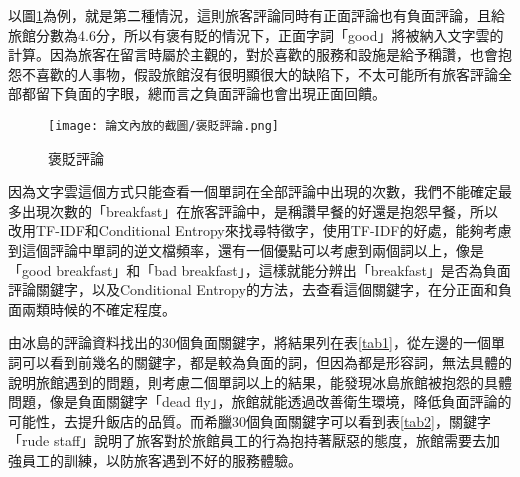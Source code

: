 \noindent 以圖\ref{Fig3}為例，就是第二種情況，這則旅客評論同時有正面評論也有負面評論，且給旅館分數為4.6分，所以有褒有貶的情況下，正面字詞「good」將被納入文字雲的計算。因為旅客在留言時屬於主觀的，對於喜歡的服務和設施是給予稱讚，也會抱怨不喜歡的人事物，假設旅館沒有很明顯很大的缺陷下，不太可能所有旅客評論全部都留下負面的字眼，總而言之負面評論也會出現正面回饋。
	
	\begin{figure}[H]
	\centering
	\texttt{[image: 論文內放的截圖/褒貶評論.png]}
	\caption{褒貶評論}
	\label{Fig3}
	\end{figure}

	因為文字雲這個方式只能查看一個單詞在全部評論中出現的次數，我們不能確定最多出現次數的「breakfast」在旅客評論中，是稱讚早餐的好還是抱怨早餐，所以改用TF-IDF和Conditional Entropy來找尋特徵字，使用TF-IDF的好處，能夠考慮到這個評論中單詞的逆文檔頻率，還有一個優點可以考慮到兩個詞以上，像是「good breakfast」和「bad breakfast」，這樣就能分辨出「breakfast」是否為負面評論關鍵字，以及Conditional Entropy的方法，去查看這個關鍵字，在分正面和負面兩類時候的不確定程度。 
	
	由冰島的評論資料找出的30個負面關鍵字，將結果列在表\ref{tab1}，從左邊的一個單詞可以看到前幾名的關鍵字，都是較為負面的詞，但因為都是形容詞，無法具體的說明旅館遇到的問題，則考慮二個單詞以上的結果，能發現冰島旅館被抱怨的具體問題，像是負面關鍵字「dead fly」，旅館就能透過改善衛生環境，降低負面評論的可能性，去提升飯店的品質。而希臘30個負面關鍵字可以看到表\ref{tab2}，關鍵字「rude staff」說明了旅客對於旅館員工的行為抱持著厭惡的態度，旅館需要去加強員工的訓練，以防旅客遇到不好的服務體驗。
	

